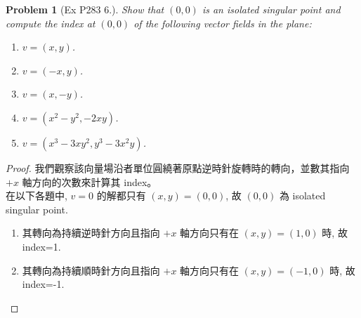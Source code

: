 \documentclass[10pt,a4paper]{article}
\newcounter{theProblemCounter}
\newtheorem{problem}[theProblemCounter]{Problem}
\begin{document}
\setcounter{theProblemCounter}{11}
\begin{problem}[Ex P283 6.]
Show that $(0,0)$ is an isolated singular point and compute the index at $(0,0)$ of the following vector fields in the plane:
\begin{enumerate}
\item[(a)] $v=(x, y)$.
\item[(b)] $v=(-x,y)$.
\item[(c)] $v=(x,-y)$.
\item[(d)] $v=(x^2-y^2,-2xy)$.
\item[(e)] $v=(x^3-3xy^2,y^3-3x^2y)$.
\end{enumerate}
\end{problem}
\begin{proof}
我們觀察該向量場沿者單位圓繞著原點逆時針旋轉時的轉向，並數其指向 $+x$ 軸方向的次數來計算其 index。\\
在以下各題中, $v=0$ 的解都只有 $(x,y)=(0,0)$, 故 $(0,0)$ 為 isolated singular point.
\begin{enumerate}
\item[(a)]
其轉向為持續逆時針方向且指向 $+x$ 軸方向只有在 $(x,y)=(1,0)$ 時, 故 index=1.\\
\item[(b)]
其轉向為持續順時針方向且指向 $+x$ 軸方向只有在 $(x,y)=(-1,0)$ 時, 故 index=-1.\\

\end{enumerate}
\end{proof}
\end{document}

